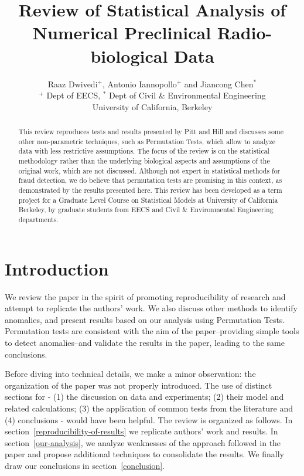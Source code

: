 \documentclass{article}
\title{Review of Statistical Analysis of Numerical Preclinical Radio-biological Data}
\author{Raaz Dwivedi$^+$,  Antonio Iannopollo$^+$ and Jiancong Chen$^*$ \\
    $^+$ Dept of EECS, $^*$ Dept of Civil \& Environmental Engineering \\
    University of California, Berkeley}
\begin{document}
    \maketitle



\begin{abstract}
This review reproduces tests and results
presented by Pitt and Hill and discusses some other non-parametric techniques, such as Permutation Tests, which allow to analyze data with less restrictive assumptions.
The focus of the review is on the statistical methodology rather than the underlying biological aspects and assumptions of the original work, which are not discussed.
Although not expert in statistical methods for fraud detection, we do believe that permutation tests are promising in this context, as demonstrated by the results presented here.
This review has been developed as a term
project for a Graduate Level Course on Statistical Models at University of California Berkeley, by graduate
students from EECS and Civil \& Environmental Engineering departments.
\end{abstract}

\section{Introduction} %
\label{sec:introduction}


We review the paper in the spirit of promoting reproducibility of research and attempt to replicate the authors' work. We also discuss other methods to identify anomalies, and present results based on our analysis using Permutation Tests. Permutation tests are consistent with the aim of the paper--providing simple tools to detect anomalies--and validate the results in the paper, leading to the same conclusions.

Before diving into technical details, we make a minor observation: the organization of the paper was not properly introduced. The use of distinct sections for - (1) the discussion on data and experiments; (2) their model and related calculations; (3) the application of common tests from the literature and (4) conclusions - would have been helpful. The review is organized as follows. In section~\ref{reproducibility-of-results} we replicate authors' work and results.
In section~\ref{our-analysis}, we analyze weaknesses of the approach followed in the paper and propose additional techniques to consolidate the results.
We finally draw our conclusions in section~\ref{conclusion}.
\end{document}
